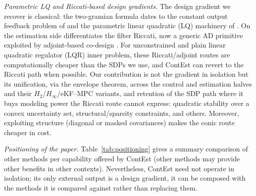 \documentclass[twocolumn,amsthm]{autart}
\begin{document}
\emph{Parametric LQ and Riccati-based design gradients.}
The design gradient we recover is classical: the two-gramian formula dates to the
constant output feedback problem of \cite{levine1970determination} and the
parametric linear quadratic (LQ) machinery of \cite{makila1987computational,rautert1997computational}. On the estimation side \cite{belabbas2016geometric} differentiates the filter
Riccati, now a generic AD primitive \cite{kao2020autodiff} exploited by
adjoint-based co-design \cite{he2026efficient}. For unconstrained and plain linear quadratic regulator (LQR) inner problem, these
Riccati/adjoint routes are computationally cheaper than the SDPs we use, and ContEst can revert to the Riccati path when possible. Our
contribution is not the gradient in isolation but its unification, via the envelope theorem, across the control and estimation halves and their
$H_2$/$H_\infty$/eKF--MPC variants, and retention of the SDP path where it buys modeling power the Riccati route cannot express: quadratic stability over a convex uncertainty set, structural/sparsity
constraints, and others. Moreover, exploiting structure (diagonal or masked covariances) makes
the conic route cheaper in cost.

\emph{Positioning of the paper.}
Table~\ref{tab:positioning} gives a summary comparison of other methods per capability offered by ContEst (other methods may provide other benefits in other contexts). Nevertheless, ContEst need not operate in isolation; its only external output is a design gradient, it can be composed with the methods it is compared against rather than replacing them.
\end{document}
